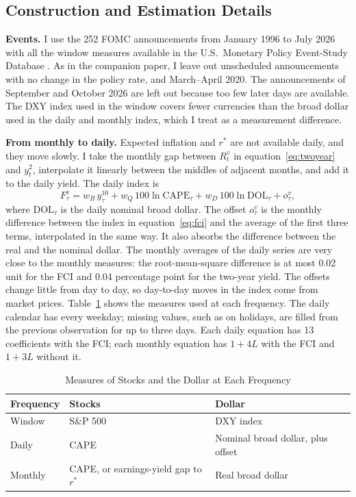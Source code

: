 \documentclass[11pt]{article}
\newcommand{\rs}{r^{*}}
\begin{document}
\begin{appendices}
\section{Construction and Estimation Details}\label{app:details}
\textbf{Events.} I use the 252 FOMC announcements from January 1996 to July 2026 with all the window measures available in the U.S.\ Monetary Policy Event-Study Database \citep{acosta2025}. As in the companion paper, I leave out unscheduled announcements with no change in the policy rate, and March--April 2020. The announcements of September and October 2026 are left out because too few later days are available. The DXY index used in the window covers fewer currencies than the broad dollar used in the daily and monthly index, which I treat as a measurement difference.

\textbf{From monthly to daily.} Expected inflation and $\rs$ are not available daily, and they move slowly. I take the monthly gap between $R_t^{v}$ in equation~\eqref{eq:twoyear} and $y^{2}_t$, interpolate it linearly between the middles of adjacent months, and add it to the daily yield. The daily index is
\begin{equation}
F_\tau^{v} = w_B\, y^{10}_\tau + w_Q\, 100\ln\text{CAPE}_\tau + w_D\, 100\ln\text{DOL}_\tau + o_\tau^{v}, \label{eq:dailyfci}
\end{equation}
where $\text{DOL}_\tau$ is the daily nominal broad dollar. The offset $o_\tau^{v}$ is the monthly difference between the index in equation~\eqref{eq:fci} and the average of the first three terms, interpolated in the same way. It also absorbs the difference between the real and the nominal dollar. The monthly averages of the daily series are very close to the monthly measures: the root-mean-square difference is at most 0.02 unit for the FCI and 0.04 percentage point for the two-year yield. The offsets change little from day to day, so day-to-day moves in the index come from market prices. Table~\ref{tab:measures} shows the measures used at each frequency. The daily calendar has every weekday; missing values, such as on holidays, are filled from the previous observation for up to three days. Each daily equation has 13 coefficients with the FCI; each monthly equation has $1+4L$ with the FCI and $1+3L$ without it.

\begin{table}[tp]\centering\small
\caption{Measures of Stocks and the Dollar at Each Frequency}\label{tab:measures}
\begin{tabular}{lll}\toprule
Frequency & Stocks & Dollar \\\midrule
Window & S\&P 500 & DXY index \\
Daily & CAPE & Nominal broad dollar, plus offset \\
Monthly & CAPE, or earnings-yield gap to $\rs$ & Real broad dollar \\\bottomrule
\end{tabular}
\end{table}


\end{appendices}
\end{document}
